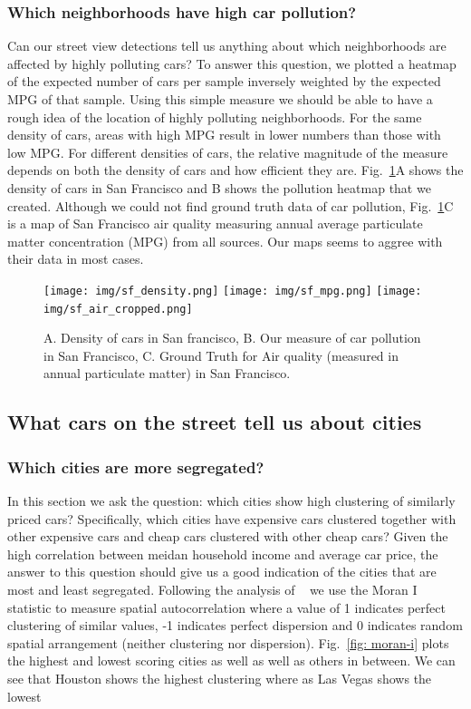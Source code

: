 \documentclass[10pt,twocolumn,letterpaper]{article}
\begin{document}
\subsubsection{Which neighborhoods have high car pollution?}
Can our street view detections tell us anything about which neighborhoods are affected by highly polluting cars? To answer this question, we plotted a heatmap of the expected number of cars per sample inversely weighted by the expected MPG of that sample. Using this simple measure we should be able to have a rough idea of the location of highly polluting neighborhoods. For the same density of cars, areas with high MPG result in lower numbers than those with low MPG. For different densities of cars, the relative magnitude of the measure depends on both the density of cars and how efficient they are. Fig.~\ref{fig:pollution}A shows the density of cars in San Francisco and B shows the pollution heatmap that we created. Although we could not find ground truth data of car pollution, Fig.~\ref{fig:pollution}C is a map of San Francisco air quality measuring annual average particulate matter concentration (MPG) from all sources. Our maps seems to aggree with their data in most cases.

\begin{figure}[t]
\begin{center}
  \raisebox{-.02\height}
 {
   \texttt{[image: img/sf\_density.png]}
 }
   \texttt{[image: img/sf\_mpg.png]}
   \texttt{[image: img/sf\_air\_cropped.png]}
\end{center}
   \caption {A. Density of cars in San francisco, B. Our measure of car pollution in San Francisco, C. Ground Truth for Air quality (measured in annual particulate matter) in San Francisco.}
\label{fig:pollution}
\end{figure}

\subsection{What cars on the street tell us about cities}
\subsubsection{Which cities are more segregated?}
In this section we ask the question: which cities show high clustering of similarly priced cars? Specifically, which cities have expensive cars clustered together with other expensive cars and cheap cars clustered with other cheap cars? Given the high correlation between meidan household income and average car price, the answer to this question should give us a good indication of the cities that are most and least segregated. Following the analysis of ~\cites{mit_plos_1} we use the Moran I statistic to measure spatial autocorrelation where a value of 1 indicates perfect clustering of similar values, -1 indicates perfect dispersion and 0 indicates random spatial arrangement (neither clustering nor dispersion). Fig.~\ref{fig: moran-i} plots the highest and lowest scoring cities as well as well as others in between. We can see that Houston shows the highest clustering where as Las Vegas shows the lowest
\end{document}

